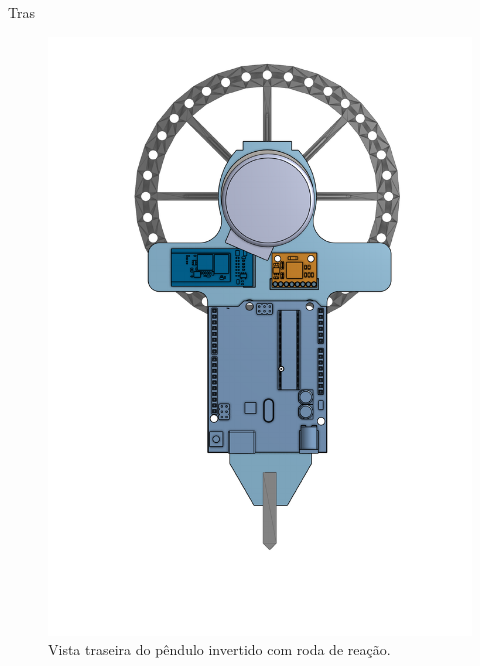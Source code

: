 \begin{frame}{Tras}
    \begin{figure}
        \centering
        \includegraphics[height=0.8\textheight]{tras.pdf}
        \caption{Vista traseira do pêndulo invertido com roda de reação.}
        \label{fig:tras}
    \end{figure}
\end{frame}

